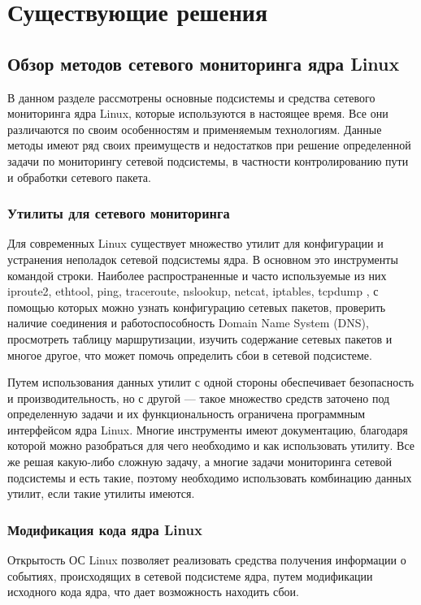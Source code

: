 \section{Существующие решения}

\subsection{Обзор методов сетевого мониторинга ядра Linux}

В данном разделе рассмотрены основные подсистемы и средства сетевого мониторинга ядра Linux, которые используются в настоящее время. Все они различаются по своим особенностям и применяемым технологиям. Данные методы имеют ряд своих преимуществ и недостатков при решение определенной задачи по мониторингу сетевой подсистемы, в частности контролированию пути и обработки сетевого пакета.

\subsubsection{Утилиты для сетевого мониторинга}
Для современных Linux существует множество утилит для конфигурации и устранения неполадок сетевой подсистемы ядра. 
В основном это инструменты командой строки.  
Наиболее распространенные и часто используемые из них iproute2, ethtool, ping, traceroute, nslookup, netcat, iptables, tcpdump \cite{tcpip_craig}, с помощью которых можно узнать конфигурацию сетевых пакетов, проверить наличие соединения и работоспособность Domain Name System (DNS), просмотреть таблицу маршрутизации, изучить содержание сетевых пакетов и многое другое, что может помочь определить сбои в сетевой подсистеме.

Путем использования данных утилит с одной стороны обеспечивает безопасность и производительность, но с другой --- такое множество средств заточено под определенную задачи и их функциональность ограничена программным интерфейсом ядра Linux.
Многие инструменты имеют документацию, благодаря которой можно разобраться для чего необходимо и как использовать утилиту. 
Все же решая какую-либо сложную задачу, а многие задачи мониторинга сетевой подсистемы и есть такие, поэтому необходимо использовать комбинацию данных утилит, если такие утилиты имеются.

\subsubsection{Модификация кода ядра Linux}
Открытость ОС Linux позволяет реализовать средства получения информации о событиях, происходящих в сетевой подсистеме ядра, путем модификации исходного кода ядра, что дает возможность находить сбои.

